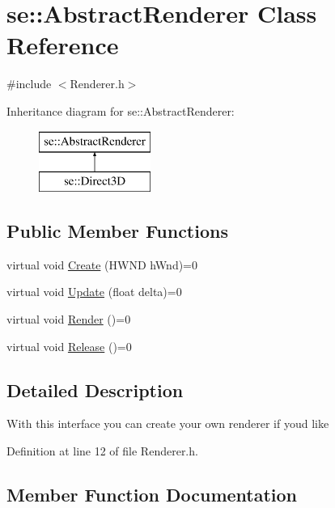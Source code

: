 \hypertarget{classse_1_1_abstract_renderer}{}\section{se\+:\+:Abstract\+Renderer Class Reference}
\label{classse_1_1_abstract_renderer}


{\ttfamily \#include $<$Renderer.\+h$>$}

Inheritance diagram for se\+:\+:Abstract\+Renderer\+:\begin{figure}[H]
\begin{center}
\leavevmode
\includegraphics[height=2.000000cm]{classse_1_1_abstract_renderer}
\end{center}
\end{figure}
\subsection*{Public Member Functions}
\begin{DoxyCompactItemize}
\item 
virtual void \mbox{\hyperlink{classse_1_1_abstract_renderer_afdfce8b91028448c17ce27550827f192}{Create}} (H\+W\+ND h\+Wnd)=0
\item 
virtual void \mbox{\hyperlink{classse_1_1_abstract_renderer_aae49e7417663d6a5aca34a2bb37b4b28}{Update}} (float delta)=0
\item 
virtual void \mbox{\hyperlink{classse_1_1_abstract_renderer_a08f813c33edad06bf7d379f8257895e6}{Render}} ()=0
\item 
virtual void \mbox{\hyperlink{classse_1_1_abstract_renderer_a98e35b7db62827580573185ed91b25bb}{Release}} ()=0
\end{DoxyCompactItemize}


\subsection{Detailed Description}
With this interface you can create your own renderer if you\textquotesingle{}d like 

Definition at line 12 of file Renderer.\+h.



\subsection{Member Function Documentation}
\mbox{\label{classse_1_1_abstract_renderer_afdfce8b91028448c17ce27550827f192}} 

